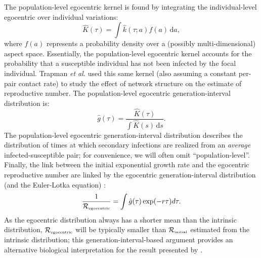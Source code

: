 \documentclass[12pt]{article}
\newcommand{\Rx}[1]{\ensuremath{{\mathcal R}_{#1}}\xspace}
\newcommand{\RR}{\ensuremath{{\mathcal R}}}
\newcommand{\Rini}{\Rx{\textrm{\tiny initial}}}
\newcommand{\Rego}{\Rx{\textrm{\tiny egocentric}}}
\newcommand{\Rhat}{\ensuremath{{\hat\RR}}}
\begin{document}
The population-level egocentric kernel is found by integrating the individual-level egocentric over individual variations:
\begin{equation}\label{eq:ego}
\hat{K}(\tau) = \int \hat{k}(\tau; a) f(a) \,\mathrm{d}a,
\end{equation}
where $f(a)$ represents a probability density over a (possibly multi-dimensional) aspect space.
Essentially, the population-level egocentric kernel accounts for the probability that a susceptible individual has not been infected by the focal individual.
Trapman \textit{et al.} \cite{trapman2016inferring} used this same kernel (also assuming a constant per-pair contact rate) to study the effect of network structure on the estimate of reproductive number.
The population-level egocentric generation-interval distribution is:
\begin{equation}
\hat{g}(\tau) = \frac{\hat{K}(\tau)}{\int \hat{K}(s)\,\mathrm{d}s}.
\label{eq:conditional}
\end{equation}
The population-level egocentric generation-interval distribution describes the distribution of times at which secondary infections are realized from an \emph{average} infected-susceptible pair; for convenience, we will often omit ``population-level''.
Finally, the link between the initial exponential growth rate and the egocentric reproductive number are linked by the egocentric generation-interval distribution (and the Euler-Lotka equation) \citep{trapman2016inferring}:
\begin{equation}
\frac{1}{\Rego} = \int \hat{g}(\tau) \exp(-r \tau) d\tau.
\label{eq:egorR}
\end{equation}
As the egocentric distribution always has a shorter mean than the intrinsic distribution, $\Rego$ will be typically smaller than $\Rini$ estimated from the intrinsic distribution;
this generation-interval-based argument provides an alternative biological interpretation for the result presented by \cite{trapman2016inferring}.
\end{document}
